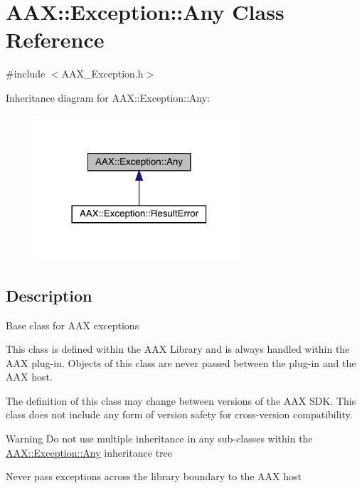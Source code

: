 \hypertarget{a01593}{}\section{A\+AX\+::Exception\+::Any Class Reference}
\label{a01593}


{\ttfamily \#include $<$A\+A\+X\+\_\+\+Exception.\+h$>$}



Inheritance diagram for A\+AX\+::Exception\+::Any\+:
\nopagebreak
\begin{figure}[H]
\begin{center}
\leavevmode
\includegraphics[width=222pt]{a01592}
\end{center}
\end{figure}


\subsection{Description}
Base class for A\+AX exceptions

This class is defined within the A\+AX Library and is always handled within the A\+AX plug-\/in. Objects of this class are never passed between the plug-\/in and the A\+AX host.

The definition of this class may change between versions of the A\+AX S\+DK. This class does not include any form of version safety for cross-\/version compatibility.

\begin{DoxyWarning}{Warning}
Do not use multiple inheritance in any sub-\/classes within the \mbox{\hyperlink{a01593}{A\+A\+X\+::\+Exception\+::\+Any}} inheritance tree

Never pass exceptions across the library boundary to the A\+AX host 
\end{DoxyWarning}
